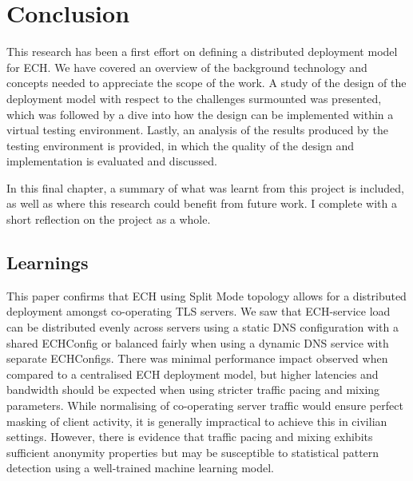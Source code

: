 \chapter{Conclusion}\label{Conclusion}

This research has been a first effort on defining a distributed deployment model for ECH. We have covered an overview of the background technology and concepts needed to appreciate the scope of the work. A study of the design of the deployment model with respect to the challenges surmounted was presented, which was followed by a dive into how the design can be implemented within a virtual testing environment. Lastly, an analysis of the results produced by the testing environment is provided, in which the quality of the design and implementation is evaluated and discussed.

In this final chapter, a summary of what was learnt from this project is included, as well as where this research could benefit from future work. I complete with a short reflection on the project as a whole.









\section{Learnings}

This paper confirms that ECH using Split Mode topology allows for a distributed deployment amongst co-operating TLS servers. We saw that ECH-service load can be distributed evenly across servers using a static DNS configuration with a shared ECHConfig or balanced fairly when using a dynamic DNS service with separate ECHConfigs. There was minimal performance impact observed when compared to a centralised ECH deployment model, but higher latencies and bandwidth should be expected when using stricter traffic pacing and mixing parameters. While normalising of co-operating server traffic would ensure perfect masking of client activity, it is generally impractical to achieve this in civilian settings. However, there is evidence that traffic pacing and mixing exhibits sufficient anonymity properties but may be susceptible to statistical pattern detection using a well-trained machine learning model.









